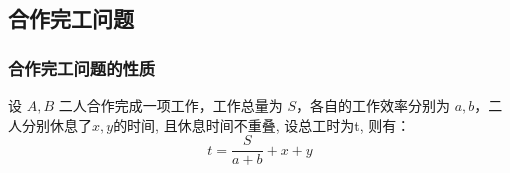 \subsection{合作完工问题}

\subsubsection{合作完工问题的性质}

设 $A, B$ 二人合作完成一项工作，工作总量为 $S$，各自的工作效率分别为 $a, b$，二人分别休息了$x, y$的时间, 且休息时间不重叠, 设总工时为t, 则有：
\[
	t = \frac{S}{a + b} + x + y
\]
